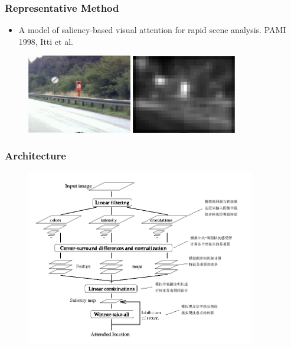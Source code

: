 \documentclass[notheorems,serif,table,compress]{beamer}  %
\begin{document}
\begin{frame}
\frametitle{Representative Method}
\begin{itemize}
\item A model of saliency-based visual attention for rapid scene analysis. PAMI 1998, Itti et al.
\end{itemize}
\begin{figure}[!ht]
  \begin{minipage}[t]{0.45\textwidth}
  \includegraphics[width=1.8in]{sign}
  \end{minipage}
  \begin{minipage}[t]{0.45\textwidth}
  \includegraphics[width=1.8in]{signSaliency}
  \end{minipage}
  \end{figure} 
\end{frame}


\begin{frame}
\frametitle{Architecture}
\begin{figure}
\includegraphics[width=10cm]{ITTImodel.png}
\end{figure}
\end{frame}
\end{document}
